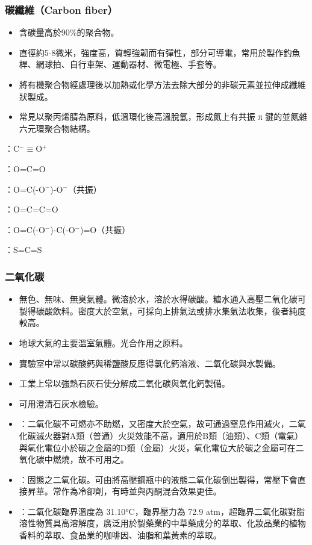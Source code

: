 \documentclass[a4paper,12pt]{report}
\begin{document}
\subsubsection{碳纖維（Carbon fiber）}
\begin{itemize}
\item 含碳量高於90\%的聚合物。
\item 直徑約5-8微米，強度高，質輕強韌而有彈性，部分可導電，常用於製作釣魚桿、網球拍、自行車架、運動器材、微電極、手套等。
\item 將有機聚合物經處理後以加熱或化學方法去除大部分的非碳元素並拉伸成纖維狀製成。
\item 常見以聚丙烯腈為原料，低溫環化後高溫脫氫，形成氮上有共振 π 鍵的並氮雜六元環聚合物結構。
\end{itemize}
\bit
\item {}：C$^-\equiv$O$^+$
\item {}：O=C=O
\item {}：O=C(-O$^-$)-O$^-$（共振）
\item {}：O=C=C=O
\item {}：O=C(-O$^-$)-C(-O$^-$)=O（共振）
\item {}：S=C=S
\eit
\subsubsection{二氧化碳}
\begin{itemize}
\item 無色、無味、無臭氣體。微溶於水，溶於水得碳酸。糖水通入高壓二氧化碳可製得碳酸飲料。密度大於空氣，可採向上排氣法或排水集氣法收集，後者純度較高。
\item 地球大氣的主要溫室氣體。光合作用之原料。
\item 實驗室中常以碳酸鈣與稀鹽酸反應得氯化鈣溶液、二氧化碳與水製備。
\item 工業上常以強熱石灰石使分解成二氧化碳與氧化鈣製備。
\item 可用澄清石灰水檢驗。
\item {}：二氧化碳不可燃亦不助燃，又密度大於空氣，故可通過窒息作用滅火，二氧化碳滅火器對A類（普通）火災效能不高，適用於B類（油類）、C類（電氣）與氧化電位小於碳之金屬的D類（金屬）火災，氧化電位大於碳之金屬可在二氧化碳中燃燒，故不可用之。
\item {}：固態之二氧化碳。可由將高壓鋼瓶中的液態二氧化碳倒出製得，常壓下會直接昇華。常作為冷卻劑，有時並與丙酮混合效果更佳。
\item {}：二氧化碳臨界溫度為 31.10°C，臨界壓力為 72.9 atm，超臨界二氧化碳對脂溶性物質具高溶解度，廣泛用於製藥業的中草藥成分的萃取、化妝品業的植物香料的萃取、食品業的咖啡因、油脂和葉黃素的萃取。
\end{itemize}
\end{document}
